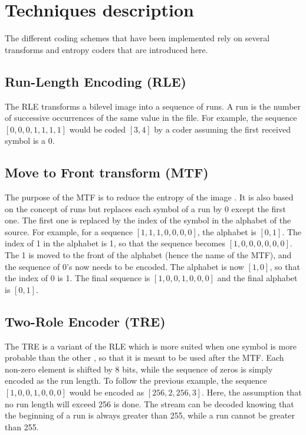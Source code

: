 \section{Techniques description}

The different coding schemes that have been implemented rely on several transforms and entropy coders that are introduced here.

\subsection{Run-Length Encoding (RLE)}

The RLE transforms a bilevel image into a sequence of runs. A run is the number of successive occurrences of the same value in the file. For example, the sequence $[0,0,0,1,1,1,1]$ would be coded $[3,4]$ by a coder assuming the first received symbol is a $0$.

\subsection{Move to Front transform (MTF)}

The purpose of the MTF is to reduce the entropy of the image \cite{benzid}. It is also based on the concept of runs but replaces each symbol of a run by 0 except the first one. The first one is replaced by the index of the symbol in the alphabet of the source. For example, for a sequence $[1,1,1,0,0,0,0]$, the alphabet is $[0,1]$. The index of 1 in the alphabet is 1, so that the sequence becomes $[1,0,0,0,0,0,0]$. The 1 is moved to the front of the alphabet (hence the name of the MTF), and the sequence of 0's now needs to be encoded. The alphabet is now $[1,0]$, so that the index of 0 is 1. The final sequence is $[1,0,0,1,0,0,0]$ and the final alphabet is $[0,1]$.

\subsection{Two-Role Encoder (TRE)}

The TRE is a variant of the RLE which is more suited when one symbol is more probable than the other \cite{benzid}, so that it is meant to be used after the MTF. Each non-zero element is shifted by 8 bits, while the sequence of zeros is simply encoded as the run length. To follow the previous example, the sequence $[1,0,0,1,0,0,0]$ would be encoded as $[256,2,256,3]$. Here, the assumption that no run length will exceed 256 is done. The stream can be decoded knowing that the beginning of a run is always greater than 255, while a run cannot be greater than 255.

